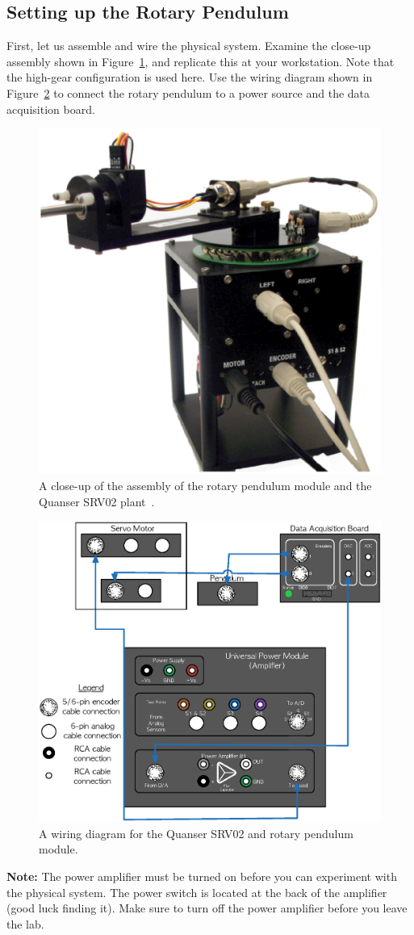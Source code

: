 \subsection{Setting up the Rotary Pendulum}\label{subsection:lab2_setup}
First, let us assemble and wire the physical system. Examine the close-up assembly shown in Figure~\ref{fig:lab1a_assembly}, and replicate this at your workstation. Note that the high-gear configuration is used here. Use the wiring diagram shown in Figure~\ref{fig:lab1a_wiring} to connect the rotary pendulum to a power source and the data acquisition board.
\begin{figure}[htb!]
    \centering
    \includegraphics[width=.3\linewidth]{eps/lab_2/assembly.eps}
    \caption{A close-up of the assembly of the rotary pendulum module and the Quanser SRV02 plant~\cite{Q-Flex-Beam}.}
    \label{fig:lab1a_assembly}
\end{figure}
\begin{figure}[htb!]
    \centering
    \includegraphics[width=.7\linewidth]{eps/lab_2/wiring.eps}
    \caption{A wiring diagram for the Quanser SRV02 and rotary pendulum module.}
    \label{fig:lab1a_wiring}
\end{figure}

\textbf{Note:} The power amplifier must be turned on before you can experiment with the physical system. The power switch is located at the back of the amplifier (good luck finding it). Make sure to turn off the power amplifier before you leave the lab.

